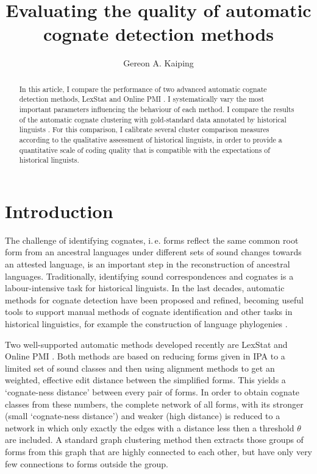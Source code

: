 \documentclass[a4paper,11pt,twocolumn]{scrartcl}
\begin{document}
\title{Evaluating the quality of automatic cognate detection methods}
\author[1]{Gereon A. Kaiping}

\maketitle
\begin{abstract}
In this article, I compare the performance of two advanced automatic cognate detection methods, LexStat \parencite{list2012lexstat} and Online PMI \parencite{rama2017fast}. I systematically vary the most important parameters influencing the behaviour of each method. I compare the results of the automatic cognate clustering with gold-standard data annotated by historical linguists \parencite{list-gold}. For this comparison, I calibrate several cluster comparison measures according to the qualitative assessment of historical linguists, in order to provide a quantitative scale of coding quality that is compatible with the expectations of historical linguists.
\end{abstract}
\section{Introduction}
The challenge of identifying cognates, i.\,e. forms reflect the same common root form from an ancestral languages under different sets of sound changes towards an attested language, is an important step in the reconstruction of ancestral languages. Traditionally, identifying sound correspondences and cognates is a labour-intensive task for historical linguists.
In the last decades, automatic methods for cognate detection have been proposed and refined, becoming useful tools to support manual methods of cognate identification and other tasks in historical linguistics, for example the construction of language phylogenies \parencite{rama2018are}.

Two well-supported automatic methods developed recently are LexStat \parencite{list2012lexstat} and Online PMI \parencite{rama2017fast}. Both methods are based on reducing forms given in IPA to a limited set of sound classes and then using alignment methods to get an weighted, effective edit distance between the simplified forms. This yields a ‘cognate-ness distance’ between every pair of forms. In order to obtain cognate classes from these numbers, the complete network of all forms, with its stronger (small ‘cognate-ness distance’) and weaker (high distance) is reduced to a network in which only exactly the edges with a distance less then a threshold $θ$ are included. A standard graph clustering method then extracts those groups of forms from this graph that are highly connected to each other, but have only very few connections to forms outside the group.
\end{document}
